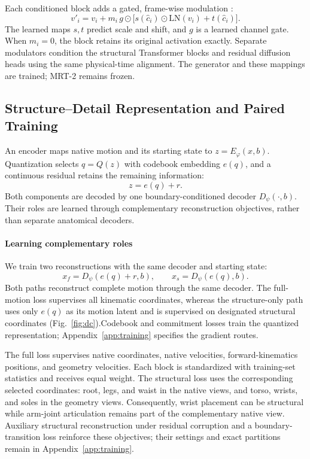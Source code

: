 Each conditioned block adds a gated, frame-wise modulation
\cite{perez2018film}:
\begin{equation}
v'_i=v_i+m_i\,g\odot
\big[s(\hat c_i)\odot\mathrm{LN}(v_i)+t(\hat c_i)\big].
\label{eq:music_film}
\end{equation}
The learned maps $s,t$ predict scale and shift, and $g$ is a learned channel
gate. When $m_i=0$, the block retains its original activation exactly.
Separate modulators condition the structural Transformer blocks and residual
diffusion heads using the same physical-time alignment. The generator and
these mappings are trained; MRT-2 remains frozen.

\subsection{Structure--Detail Representation and Paired Training}
\label{sec:dc}
An encoder maps native motion and its starting state to $z=E_\varphi(x,b)$.
Quantization selects $q=Q(z)$ with codebook embedding $e(q)$, and a continuous
residual retains the remaining information:
\begin{equation}
z=e(q)+r.
\label{eq:latent}
\end{equation}
Both components are decoded by one boundary-conditioned decoder
$D_\psi(\cdot,b)$. Their roles are learned through complementary reconstruction
objectives, rather than separate anatomical decoders.

\paragraph{Learning complementary roles}
We train two reconstructions with the same decoder and starting state:
\begin{equation}
x_f=D_\psi(e(q)+r,b),\qquad x_s=D_\psi(e(q),b).
\label{eq:paired_paths}
\end{equation}
Both paths reconstruct complete motion through the same decoder.
The full-motion loss supervises all kinematic coordinates,
whereas the structure-only path uses only $e(q)$ as its motion
latent and is supervised on designated structural coordinates
(Fig.~\ref{fig:dc}).Codebook and commitment losses train the quantized
representation; Appendix~\ref{app:training} specifies the gradient routes.

The full loss supervises native coordinates, native velocities,
forward-kinematics positions, and geometry velocities. Each block is
standardized with training-set statistics and receives equal weight.
The structural loss uses the corresponding selected coordinates: root,
legs, and waist in the native views, and torso, wrists, and soles in the
geometry views. Consequently, wrist placement can be
structural while arm-joint articulation remains part of the complementary
native view. Auxiliary structural reconstruction under residual corruption
and a boundary-transition loss reinforce these objectives; their settings
and exact partitions remain in Appendix~\ref{app:training}.

